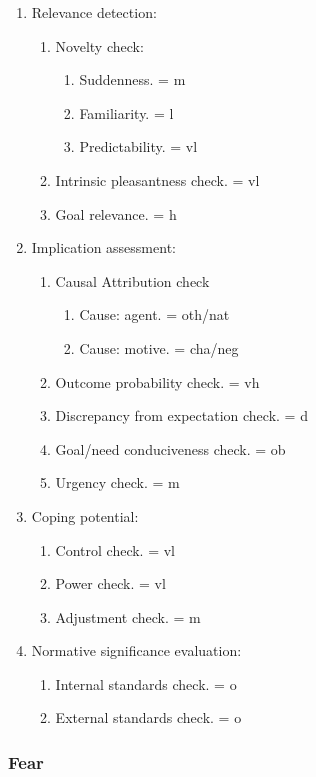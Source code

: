 \begin{enumerate}
 \item  Relevance detection:
 \begin{enumerate}
  \item  Novelty check:
  \begin{enumerate}
   \item  Suddenness. = m
   \item  Familiarity. = l
   \item  Predictability. = vl
  \end{enumerate}
  \item  Intrinsic pleasantness check. = vl
  \item  Goal relevance. = h
 \end{enumerate}
 \item  Implication assessment:
 \begin{enumerate}
  \item  Causal Attribution check
  \begin{enumerate}
   \item  Cause: agent. = oth/nat
   \item  Cause: motive. = cha/neg
  \end{enumerate}
  \item  Outcome probability check. = vh
  \item  Discrepancy from expectation check. = d
  \item  Goal/need conduciveness check. = ob
  \item  Urgency check. = m
 \end{enumerate}
 \item  Coping potential:
 \begin{enumerate}
  \item  Control check. = vl
  \item  Power check. = vl
  \item  Adjustment check. = m
 \end{enumerate}
 \item  Normative significance evaluation:
 \begin{enumerate}
  \item  Internal standards check. = o
  \item  External standards check. = o
 \end{enumerate}
\end{enumerate}

\subsubsection{Fear}

